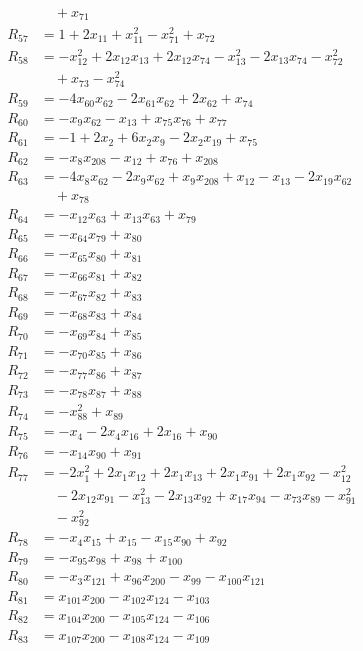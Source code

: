 \begin{align*}
&\quad{}+x_{71}\\
R_{57}&=1+2x_{11}+x_{11}^{2}-x_{71}^{2}+x_{72}\\
R_{58}&=-x_{12}^{2}+2x_{12}x_{13}+2x_{12}x_{74}-x_{13}^{2}-2x_{13}x_{74}-x_{72}^{2}\\
&\quad{}+x_{73}-x_{74}^{2}\\
R_{59}&=-4x_{60}x_{62}-2x_{61}x_{62}+2x_{62}+x_{74}\\
R_{60}&=-x_{9}x_{62}-x_{13}+x_{75}x_{76}+x_{77}\\
R_{61}&=-1+2x_{2}+6x_{2}x_{9}-2x_{2}x_{19}+x_{75}\\
R_{62}&=-x_{8}x_{208}-x_{12}+x_{76}+x_{208}\\
R_{63}&=-4x_{8}x_{62}-2x_{9}x_{62}+x_{9}x_{208}+x_{12}-x_{13}-2x_{19}x_{62}\\
&\quad{}+x_{78}\\
R_{64}&=-x_{12}x_{63}+x_{13}x_{63}+x_{79}\\
R_{65}&=-x_{64}x_{79}+x_{80}\\
R_{66}&=-x_{65}x_{80}+x_{81}\\
R_{67}&=-x_{66}x_{81}+x_{82}\\
R_{68}&=-x_{67}x_{82}+x_{83}\\
R_{69}&=-x_{68}x_{83}+x_{84}\\
R_{70}&=-x_{69}x_{84}+x_{85}\\
R_{71}&=-x_{70}x_{85}+x_{86}\\
R_{72}&=-x_{77}x_{86}+x_{87}\\
R_{73}&=-x_{78}x_{87}+x_{88}\\
R_{74}&=-x_{88}^{2}+x_{89}\\
R_{75}&=-x_{4}-2x_{4}x_{16}+2x_{16}+x_{90}\\
R_{76}&=-x_{14}x_{90}+x_{91}\\
R_{77}&=-2x_{1}^{2}+2x_{1}x_{12}+2x_{1}x_{13}+2x_{1}x_{91}+2x_{1}x_{92}-x_{12}^{2}\\
&\quad{}-2x_{12}x_{91}-x_{13}^{2}-2x_{13}x_{92}+x_{17}x_{94}-x_{73}x_{89}-x_{91}^{2}\\
&\quad{}-x_{92}^{2}\\
R_{78}&=-x_{4}x_{15}+x_{15}-x_{15}x_{90}+x_{92}\\
R_{79}&=-x_{95}x_{98}+x_{98}+x_{100}\\
R_{80}&=-x_{3}x_{121}+x_{96}x_{200}-x_{99}-x_{100}x_{121}\\
R_{81}&=x_{101}x_{200}-x_{102}x_{124}-x_{103}\\
R_{82}&=x_{104}x_{200}-x_{105}x_{124}-x_{106}\\
R_{83}&=x_{107}x_{200}-x_{108}x_{124}-x_{109}\\

\end{align*}
